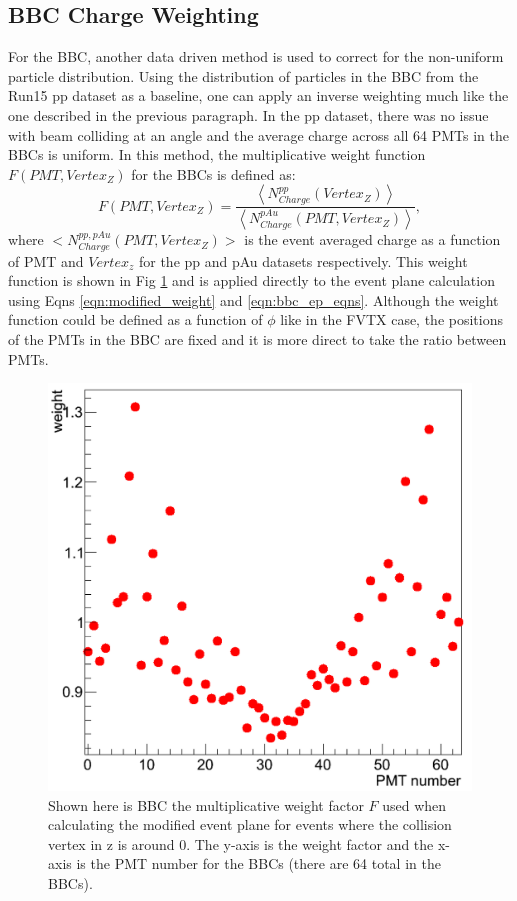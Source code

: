 \subsection{BBC Charge Weighting}
\label{sec:bbc_charge_weight}
For the BBC, another data driven method is used to correct for the non-uniform particle distribution. Using the distribution of particles in the BBC from the Run15 pp dataset as a baseline, one can apply an inverse weighting much like the one described in the previous paragraph. In the pp dataset, there was no issue with beam colliding at an angle and the average charge across all 64 PMTs in the BBCs is uniform. In this method, the multiplicative weight function $F(PMT,Vertex_Z)$ for the BBCs is defined as:
\begin{equation}
F(PMT,Vertex_Z) = \frac{\left<N^{pp}_{Charge}(Vertex_Z)\right>}{\left<N^{pAu}_{Charge}(PMT,Vertex_Z)\right>},
\end{equation}
where $<N^{pp,pAu}_{Charge}(PMT,Vertex_Z)>$ is the event averaged charge as a function of PMT and $Vertex_z$ for the pp and pAu datasets respectively. 
This weight function is shown in Fig \ref{fig:bbc_weight_function} and is applied directly to the event plane calculation using Eqns \ref{eqn:modified_weight} and \ref{eqn:bbc_ep_eqns}. 
Although the weight function could be defined as a function of $\phi$ like in the FVTX case, the positions of the PMTs in the BBC are fixed and it is more direct to take the ratio between PMTs.

\begin{figure}[h!]
\begin{center}
\includegraphics[width=0.5\linewidth]{figs/pmt_ratio_weight.png}
\caption{Shown here is BBC the multiplicative weight factor $F$ used when calculating the modified event plane for events where the collision vertex in z is around 0. The y-axis is the weight factor and the x-axis is the PMT number for the BBCs (there are 64 total in the BBCs). }
\label{fig:bbc_weight_function}
\end{center}
\end{figure}

